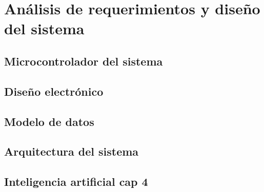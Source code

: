 \chapter{Análisis de requerimientos y diseño del sistema}
\label{chap:diseño_sistema}

\section{Microcontrolador del sistema}


\section{Diseño electrónico}


\section{Modelo de datos}


\section{Arquitectura del sistema}


\section{Inteligencia artificial cap 4}
